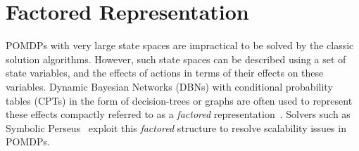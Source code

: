 \documentclass{aamas2013}
\begin{document}
\section{Factored Representation}\label{sec:4}

POMDPs with very large state spaces are impractical to be solved by the classic solution algorithms. However, such state spaces can be described using a set of state variables, and the effects of actions in terms of their effects on these variables. Dynamic Bayesian Networks (DBNs) with conditional probability tables (CPTs) in the form of decision-trees or
graphs are often used to represent these effects compactly referred to as a \textit{factored} representation~\cite{shani2013task}. Solvers such as Symbolic Perseus~\cite{poupart2005exploiting} exploit this \textit{factored} structure to resolve scalability issues in POMDPs.
\end{document}
